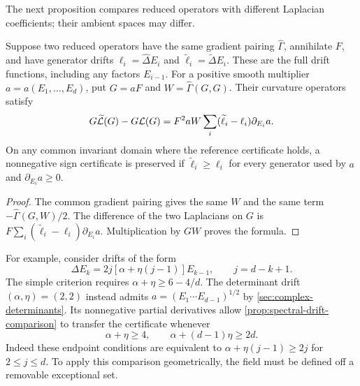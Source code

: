 The next proposition compares reduced operators with different
Laplacian coefficients; their ambient spaces may differ.

\begin{proposition}
\label{prop:spectral-drift-comparison}
Suppose two reduced operators have the same gradient pairing
\(\widehat\Gamma\), annihilate \(F\), and have generator drifts
\(\ell_i=\widehat\Delta E_i\) and
\(\widetilde\ell_i=\widetilde\Delta E_i\).  These are the full
drift functions, including any factors \(E_{i-1}\).
For a positive smooth multiplier
\(a=a(E_1,\ldots,E_d)\), put \(G=aF\) and
\(W=\widehat\Gamma(G,G)\).  Their curvature operators satisfy
\begin{equation}\label{eq:spectral-drift-comparison}
 G\widetilde{\mathcal L}(G)-G\mathcal L(G)
 =F^2aW\sum_i(\widetilde\ell_i-\ell_i)\partial_{E_i}a.
\end{equation}
On any common invariant domain where the reference certificate holds,
a nonnegative sign certificate is preserved if
\(\widetilde\ell_i\ge\ell_i\) for every generator used by \(a\)
and \(\partial_{E_i}a\ge0\).
\end{proposition}

\begin{proof}
The common gradient pairing gives the same \(W\) and the same
term \(-\widehat\Gamma(G,W)/2\).  The difference of the two
Laplacians on \(G\) is
\(F\sum_i(\widetilde\ell_i-\ell_i)\partial_{E_i}a\).
Multiplication by \(GW\) proves the formula.
\end{proof}

For example, consider drifts of the form
\begin{equation}\label{eq:spectral-two-parameter-drift}
 \Delta E_k=2j[\alpha+\eta(j-1)]E_{k-1},
 \qquad j=d-k+1.
\end{equation}
The simple criterion requires \(\alpha+\eta\ge6-4/d\).
The determinant drift \((\alpha,\eta)=(2,2)\) instead admits
\(a=(E_1\cdots E_{d-1})^{1/2}\) by
\cref{sec:complex-determinants}. Its nonnegative partial derivatives
allow \cref{prop:spectral-drift-comparison} to transfer the certificate
whenever
\begin{equation}\label{eq:spectral-determinant-drift-range}
 \alpha+\eta\ge4,\qquad
 \alpha+(d-1)\eta\ge2d.
\end{equation}
Indeed these endpoint conditions are equivalent to
\(\alpha+\eta(j-1)\ge2j\) for \(2\le j\le d\).
To apply this comparison geometrically, the field must be defined off
a removable exceptional set.
